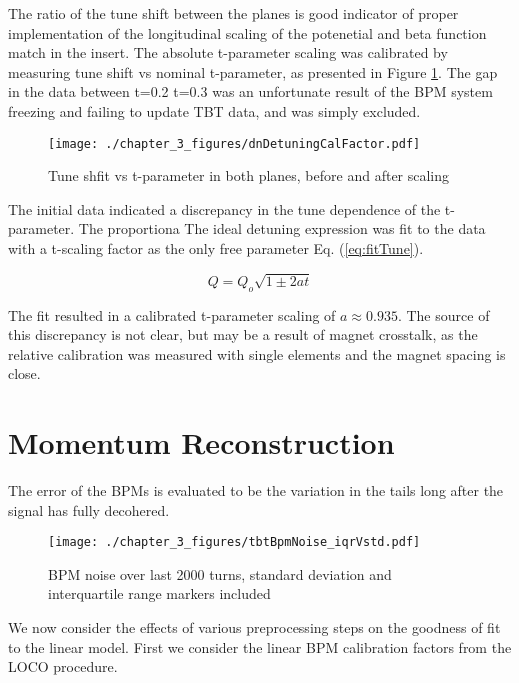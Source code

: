 The ratio of the tune shift between the planes is good indicator of proper implementation of the longitudinal scaling of the potenetial and beta function match in the insert. The absolute t-parameter scaling was calibrated by measuring tune shift vs nominal t-parameter, as presented in Figure \ref{fig:dnTuneVsT}. The gap in the data between t=0.2 t=0.3 was an unfortunate result of the BPM system freezing and failing to update TBT data, and was simply excluded.

\begin{figure}
    \centering
    \texttt{[image: ./chapter\_3\_figures/dnDetuningCalFactor.pdf]}
    \caption{Tune shfit vs t-parameter in both planes, before and after scaling}
    \label{fig:dnTuneVsT}
\end{figure}

The initial data indicated a discrepancy in the tune dependence of the t-parameter. The proportiona The ideal detuning expression was fit to the data with a t-scaling factor as the only free parameter Eq. (\ref{eq:fitTune}). 

\begin{equation}
    Q = Q_o \sqrt{1\pm 2at}
    \label{eq:fitTune}
\end{equation}

The fit resulted in a calibrated t-parameter scaling of $a \approx 0.935$. The source of this discrepancy is not clear, but may be a result of magnet crosstalk, as the relative calibration was measured with single elements and the magnet spacing is close.

\section{Momentum Reconstruction} \label{sec:momReconst}

The error of the BPMs is evaluated to be the variation in the tails long after the signal has fully decohered.

\begin{figure}
    \centering
    \texttt{[image: ./chapter\_3\_figures/tbtBpmNoise\_iqrVstd.pdf]}
    \caption{BPM noise over last 2000 turns, standard deviation and interquartile range markers included}
    \label{fig:bpmErrIQR}
\end{figure}

We now consider the effects of various preprocessing steps on the goodness of fit to the linear model. First we consider the linear BPM calibration factors from the LOCO procedure.

